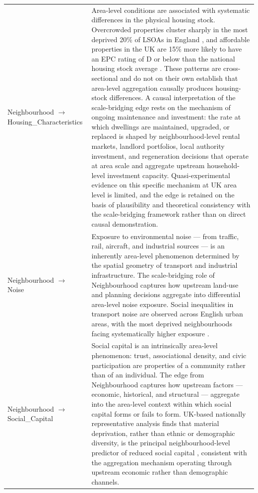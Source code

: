 \begin{longtable}{@{}p{3.8cm}p{11.2cm}@{}}
Neighbourhood $\to$ Housing\_Characteristics & Area-level conditions are associated with systematic differences in the physical housing stock. Overcrowded properties cluster sharply in the most deprived 20\% of LSOAs in England \citep{norman_housing_2022}, and affordable properties in the UK are 15\% more likely to have an EPC rating of D or below than the national housing stock average \citep{waters_housing_2023}. These patterns are cross-sectional and do not on their own establish that area-level aggregation causally produces housing-stock differences. A causal interpretation of the scale-bridging edge rests on the mechanism of ongoing maintenance and investment: the rate at which dwellings are maintained, upgraded, or replaced is shaped by neighbourhood-level rental markets, landlord portfolios, local authority investment, and regeneration decisions that operate at area scale and aggregate upstream household-level investment capacity. Quasi-experimental evidence on this specific mechanism at UK area level is limited, and the edge is retained on the basis of plausibility and theoretical consistency with the scale-bridging framework rather than on direct causal demonstration. \\
\addlinespace
Neighbourhood $\to$ Noise & Exposure to environmental noise --- from traffic, rail, aircraft, and industrial sources --- is an inherently area-level phenomenon determined by the spatial geometry of transport and industrial infrastructure. The scale-bridging role of Neighbourhood captures how upstream land-use and planning decisions aggregate into differential area-level noise exposure. Social inequalities in transport noise are observed across English urban areas, with the most deprived neighbourhoods facing systematically higher exposure \citep{moreno-martos_small-area_2023, tonne_socioeconomic_2018}. \\
\addlinespace
Neighbourhood $\to$ Social\_Capital & Social capital is an intrinsically area-level phenomenon: trust, associational density, and civic participation are properties of a community rather than of an individual. The edge from Neighbourhood captures how upstream factors --- economic, historical, and structural --- aggregate into the area-level context within which social capital forms or fails to form. UK-based nationally representative analysis finds that material deprivation, rather than ethnic or demographic diversity, is the principal neighbourhood-level predictor of reduced social capital \citep{chan_social_2024, forrest_social_2001}, consistent with the aggregation mechanism operating through upstream economic rather than demographic channels. \\
\end{longtable}

